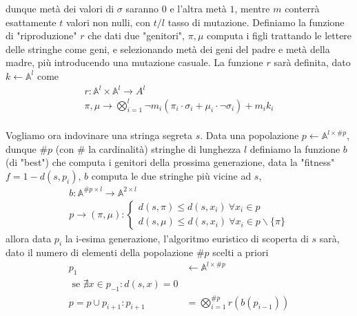 \documentclass{book}
\begin{document}
dunque metà dei valori di $\sigma$ saranno $0$ e l'altra metà $1$, mentre $m$ conterrà esattamente $t$ valori  non nulli, con $t/l$ tasso di mutazione. Definiamo la funzione di "riproduzione" $r$ che dati due "genitori", $\pi, \mu$ computa i figli trattando le lettere delle stringhe come geni, e selezionando metà dei geni del padre e metà della madre, più introducendo una mutazione casuale. La funzione $r$ sarà definita, dato $k \leftarrow \mathbb{A}^{l}$ come 
\begin{gather*}
r : \mathbb{A}^{l} \times \mathbb{A}^{l} \rightarrow A^{l} \\
\pi, \mu \rightarrow \bigotimes_{i=1}^{l}\neg m_{i}(\pi_{i} \cdot \sigma_{i} + \mu_{i} \cdot \neg\sigma_{i}) + m_{i}k_{i}
\end{gather*}

\paragraph{} Vogliamo ora indovinare una stringa segreta $s$. Data una popolazione $p \leftarrow \mathbb{A}^{l \times \#p}$, dunque $\#p$ (con $\#$ la cardinalità) stringhe di lunghezza $l$ definiamo la funzione $b$ (di "best") che computa i genitori della prossima generazione, data la "fitness" $f = 1 - d(s, p_{i})$, $b$ computa le due stringhe più vicine ad $s$,
\begin{gather*}
    b : \mathbb{A}^{\#p \times l} \rightarrow \mathbb{A}^{2 \times l} \\ p \rightarrow (\pi, \mu) : \begin{cases} d(s, \pi) \leq d(s, x_{i}) \ \forall x_{i} \in p \\ d(s, \mu) \leq d(s, x_{i}) \ \forall x_{i} \in p \backslash \{\pi\} \end{cases}
\end{gather*}
allora data $p_{i}$ la i-esima generazione, l'algoritmo euristico di scoperta di $s$ sarà, dato il numero di elementi della popolazione $\#p$ scelti a priori
\begin{align*}
p_{1} & \leftarrow \mathbb{A}^{l \times \# p} \\
\text{ se } \nexists x \in p_{-1} : d(s, x) = 0 \\
p = p \cup p_{i + 1} : p_{i + 1} & = \bigotimes_{i = 1}^{\#p}r(b(p_{i - 1}))
\end{align*}
\end{document}
